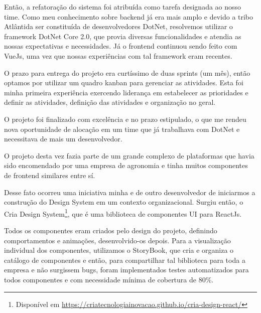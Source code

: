 Então, a refatoração do sistema foi atribuída como tarefa designada ao nosso time.
Como meu conhecimento sobre backend já era mais amplo e devido a tribo Atlântida ser constituída de desenvolvedores DotNet, resolvemos utilizar o framework DotNet Core 2.0, que 
provia diversas funcionalidades e atendia as nossas expectativas e necessidades.
Já o frontend continuou sendo feito com VueJs, uma vez que nossas experiências com tal framework eram recentes.

O prazo para entrega do projeto era curtíssimo de duas sprints (um mês), então optamos por utilizar um quadro kanban para gerenciar as atividades.
Esta foi minha primeira experiência exercendo liderança em estabelecer as prioridades e definir as atividades, definição das atividades e organização no geral.

O projeto foi finalizado com excelência e no prazo estipulado, o que me rendeu nova oportunidade de alocação em um time que já trabalhava com DotNet e necessitava de mais um desenvolvedor.

O projeto desta vez fazia parte de um grande complexo de plataformas que havia sido encomendado por uma empresa de agronomia e tinha muitos componentes de frontend similares entre sí.

Desse fato ocorreu uma iniciativa minha e de outro desenvolvedor de iniciarmos a construção do Design System em um contexto organizacional.
Surgiu então, o Cria Design System\footnote{Disponível em \url{https://criatecnologiainovacao.github.io/cria-design-react/}}, que é uma biblioteca de componentes UI para ReactJs.

Todos os componentes eram criados pelo design do projeto, definindo comportamentos e animações, desenvolvido-os depois. Para a visualização individual dos componentes, utilizamos o StoryBook,
que cria e organiza o catálogo de componentes e então, para compartilhar tal biblioteca para toda a empresa e não surgissem bugs, foram implementados testes automatizados para todos componentes e com necessidade mínima de cobertura de 80\%.


